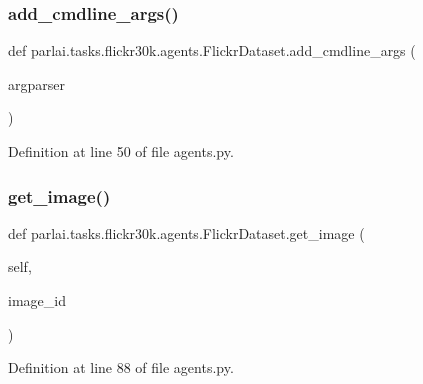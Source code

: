 \subsubsection{\texorpdfstring{add\+\_\+cmdline\+\_\+args()}{add\_cmdline\_args()}}
{\footnotesize\ttfamily def parlai.\+tasks.\+flickr30k.\+agents.\+Flickr\+Dataset.\+add\+\_\+cmdline\+\_\+args (\begin{DoxyParamCaption}\item[{}]{argparser }\end{DoxyParamCaption})\hspace{0.3cm}{\ttfamily [static]}}



Definition at line 50 of file agents.\+py.

\mbox{\label{classparlai_1_1tasks_1_1flickr30k_1_1agents_1_1FlickrDataset_af2517dc3b4a7670305ad9a517a8d49c1}} 
\subsubsection{\texorpdfstring{get\+\_\+image()}{get\_image()}}
{\footnotesize\ttfamily def parlai.\+tasks.\+flickr30k.\+agents.\+Flickr\+Dataset.\+get\+\_\+image (\begin{DoxyParamCaption}\item[{}]{self,  }\item[{}]{image\+\_\+id }\end{DoxyParamCaption})}



Definition at line 88 of file agents.\+py.



